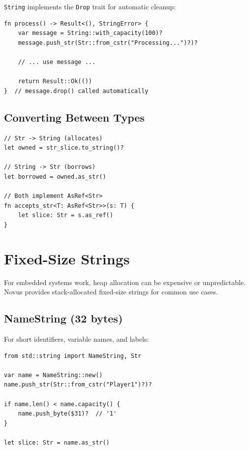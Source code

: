 \texttt{String} implements the \texttt{Drop} trait for automatic cleanup:

\begin{lstlisting}
fn process() -> Result<(), StringError> {
    var message = String::with_capacity(100)?
    message.push_str(Str::from_cstr("Processing...")?)?

    // ... use message ...

    return Result::Ok(())
}  // message.drop() called automatically
\end{lstlisting}

\subsection{Converting Between Types}

\begin{lstlisting}
// Str -> String (allocates)
let owned = str_slice.to_string()?

// String -> Str (borrows)
let borrowed = owned.as_str()

// Both implement AsRef<Str>
fn accepts_str<T: AsRef<Str>>(s: T) {
    let slice: Str = s.as_ref()
}
\end{lstlisting}

\section{Fixed-Size Strings}
\label{sec:fixed-strings}

For embedded systems work, heap allocation can be expensive or unpredictable. Novus provides stack-allocated fixed-size strings for common use cases.

\subsection{NameString (32 bytes)}

For short identifiers, variable names, and labels:

\begin{lstlisting}
from std::string import NameString, Str

var name = NameString::new()
name.push_str(Str::from_cstr("Player1")?)?

if name.len() < name.capacity() {
    name.push_byte($31)?  // '1'
}

let slice: Str = name.as_str()
\end{lstlisting}

